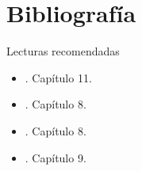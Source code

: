 \documentclass[9pt, aspectratio=169]{beamer}
\begin{document}
\section*{Bibliografía}
\begin{frame}[allowframebreaks]{Lecturas recomendadas}
\begin{itemize}
    \item {}. Capítulo 11.
    \item {}. Capítulo 8.
    \item {}. Capítulo 8.
    \item {}. Capítulo 9.
\end{itemize}
\end{frame}
\end{document}
